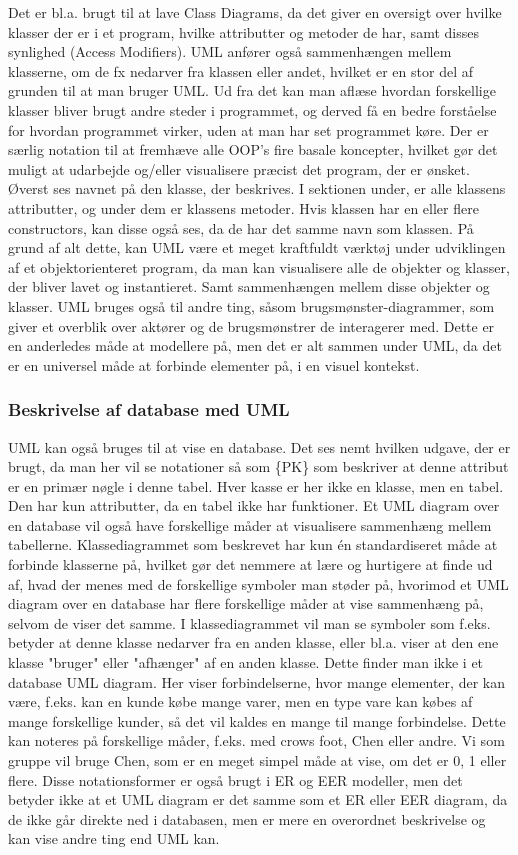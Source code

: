 Det er bl.a. brugt til at lave Class Diagrams, da det giver en oversigt over hvilke klasser der er i et program, hvilke attributter og metoder de har, samt disses synlighed (Access Modifiers). UML anfører også sammenhængen mellem klasserne, om de fx nedarver fra klassen eller andet, hvilket er en stor del af grunden til at man bruger UML.  Ud fra det kan man aflæse hvordan forskellige klasser bliver brugt andre steder i programmet, og derved få en bedre forståelse for hvordan programmet virker, uden at man har set programmet køre. Der er særlig notation til at fremhæve alle OOP's fire basale koncepter, hvilket gør det muligt at udarbejde og/eller visualisere præcist det program, der er ønsket. Øverst ses navnet på den klasse, der beskrives. I sektionen under, er alle klassens attributter, og under dem er klassens metoder. Hvis klassen har en eller flere constructors, kan disse også ses, da de har det samme navn som klassen. På grund af alt dette, kan UML være et meget kraftfuldt værktøj under udviklingen af et objektorienteret program, da man kan visualisere alle de objekter og klasser, der bliver lavet og instantieret. Samt sammenhængen mellem disse objekter og klasser. UML bruges også til andre ting, såsom brugsmønster-diagrammer, som giver et overblik over aktører og de brugsmønstrer de interagerer med. Dette er en anderledes måde at modellere på, men det er alt sammen under UML, da det er en universel måde at forbinde elementer på, i en visuel kontekst.


\subsubsection{Beskrivelse af database med UML}
UML kan også bruges til at vise en database. Det ses nemt hvilken udgave, der er brugt, da man her vil se notationer så som \{PK\} som beskriver at denne attribut er en primær nøgle i denne tabel. Hver kasse er her ikke en klasse, men en tabel. Den har kun attributter, da en tabel ikke har funktioner. Et UML diagram over en database vil også have forskellige måder at visualisere sammenhæng mellem tabellerne.
Klassediagrammet som beskrevet har kun én standardiseret måde at forbinde klasserne på, hvilket gør det nemmere at lære og hurtigere at finde ud af, hvad der menes med de forskellige symboler man støder på, hvorimod et UML diagram over en database har flere forskellige måder at vise sammenhæng på, selvom de viser det samme. I klassediagrammet vil man se symboler som f.eks. betyder at denne klasse nedarver fra en anden klasse, eller bl.a. viser at den ene klasse "bruger" eller "afhænger" af en anden klasse. Dette finder man ikke i et database UML diagram. Her viser forbindelserne, hvor mange elementer, der kan være, f.eks. kan en kunde købe mange varer, men en type vare kan købes af mange forskellige kunder, så det vil kaldes en mange til mange forbindelse. Dette kan noteres på forskellige måder, f.eks. med crows foot, Chen eller andre. Vi som gruppe vil bruge Chen, som er en meget simpel måde at vise, om det er 0, 1 eller flere. Disse notationsformer er også brugt i ER og EER modeller, men det betyder ikke at et UML diagram er det samme som et ER eller EER diagram, da de ikke går direkte ned i databasen, men er mere en overordnet beskrivelse og kan vise andre ting end UML kan.


